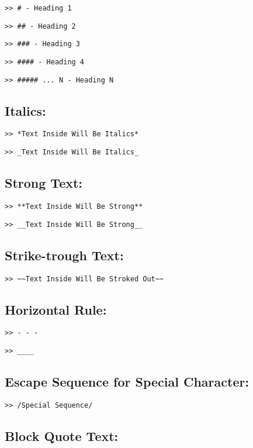 \documentclass[12pt,british]{article}
\begin{document}
\noindent \texttt{>\textcompwordmark > \# - Heading 1}

\noindent \texttt{>\textcompwordmark > \#\# - Heading 2}

\noindent \texttt{>\textcompwordmark > \#\#\# - Heading 3}

\noindent \texttt{>\textcompwordmark > \#\#\#\# - Heading 4}

\noindent \texttt{>\textcompwordmark > \#\#\#\#\# ... N - Heading
	N}

\subsection{Italics:}

\noindent \texttt{>\textcompwordmark > {*}Text Inside Will Be Italics{*}}

\noindent \texttt{>\textcompwordmark > \_Text Inside Will Be Italics\_}

\subsection{Strong Text:}

\noindent \texttt{>\textcompwordmark > {*}{*}Text Inside Will Be
	Strong{*}{*}}

\noindent \texttt{>\textcompwordmark > \_\_Text Inside Will Be Strong\_\_}

\subsection{Strike-trough Text:}

\noindent \texttt{>\textcompwordmark > \textasciitilde\textasciitilde Text
	Inside Will Be Stroked Out\textasciitilde\textasciitilde}

\subsection{Horizontal Rule:}

\noindent \texttt{>\textcompwordmark > - - -}

\noindent \texttt{>\textcompwordmark > \_\_\_\_}

\subsection{Escape Sequence for Special Character:}

\noindent \texttt{>\textcompwordmark > /Special Sequence/}

\subsection{Block Quote Text:}
\end{document}
